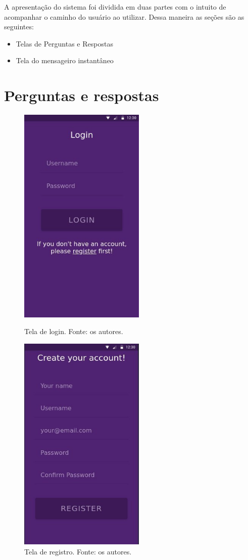 A apresentação do sistema foi dividida em duas partes com o intuito de acompanhar o caminho do usuário ao utilizar. Dessa maneira as seções são as seguintes:

\begin{itemize}
\item Telas de Perguntas e Respostas
\item Tela do mensageiro instantâneo
\end{itemize}

\section{Perguntas e respostas}
\FloatBarrier

\begin{figure}
\centering
\begin{minipage}{0.45\textwidth}
\centering
\includegraphics[width=6cm]{telalogin.png}
\caption{Tela de login. Fonte: os autores.}
\label{fig:telalogin}
\end{minipage}\hfill
\begin{minipage}{0.45\textwidth}
\centering
\includegraphics[width=6cm]{telaregister.png}
\caption{Tela de registro. Fonte: os autores.}
\label{fig:telaregister}
\end{minipage}
\end{figure}

